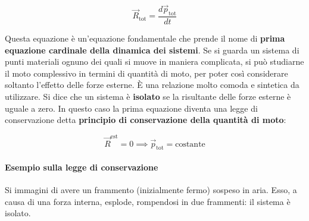 \[
	\boxed{\vec{R}_\text{tot}=\frac{d\vec{p}_\text{tot}}{dt}}
\]

Questa equazione è un'equazione fondamentale che prende il nome di \textbf{prima equazione cardinale della dinamica dei sistemi}. Se si guarda un sistema di punti materiali ognuno dei quali si muove in maniera complicata, si può studiarne il moto complessivo in termini di quantità di moto, per poter così considerare soltanto l'effetto delle forze esterne. È una relazione molto comoda e sintetica da utilizzare.
Si dice che un sistema è \textbf{isolato} se la risultante delle forze esterne è uguale a zero. In questo caso la prima equazione diventa una legge di conservazione detta \textbf{principio di conservazione della quantità di moto}:

\[
	\boxed{\vec{R}^\text{est}=0 \implies \vec{p}_\text{tot}=\text{costante}}
\]

\paragraph{Esempio sulla legge di conservazione} Si immagini di avere un frammento (inizialmente fermo) sospeso in aria. Esso, a causa di una forza interna, esplode, rompendosi in due frammenti: il sistema è isolato.

